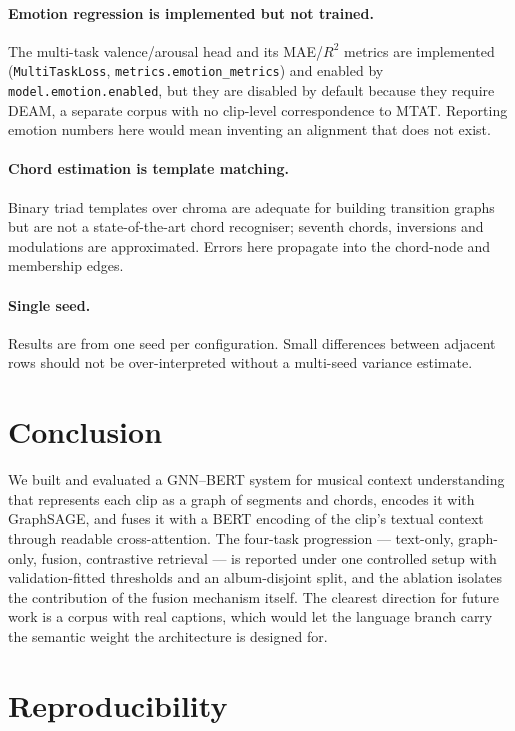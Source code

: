 \documentclass{article}
\begin{document}
\paragraph{Emotion regression is implemented but not trained.} The multi-task
valence/arousal head and its MAE/$R^2$ metrics are implemented
(\texttt{MultiTaskLoss}, \texttt{metrics.emotion\_metrics}) and enabled by
\texttt{model.emotion.enabled}, but they are disabled by default because they
require DEAM, a separate corpus with no clip-level correspondence to MTAT.
Reporting emotion numbers here would mean inventing an alignment that does not
exist.

\paragraph{Chord estimation is template matching.} Binary triad templates over
chroma are adequate for building transition graphs but are not a state-of-the-art
chord recogniser; seventh chords, inversions and modulations are approximated.
Errors here propagate into the chord-node and membership edges.

\paragraph{Single seed.} Results are from one seed per configuration. Small
differences between adjacent rows should not be over-interpreted without a
multi-seed variance estimate.

\section{Conclusion}
\label{sec:conclusion}

We built and evaluated a GNN--BERT system for musical context understanding that
represents each clip as a graph of segments and chords, encodes it with
GraphSAGE, and fuses it with a BERT encoding of the clip's textual context
through readable cross-attention. The four-task progression --- text-only,
graph-only, fusion, contrastive retrieval --- is reported under one controlled
setup with validation-fitted thresholds and an album-disjoint split, and the
ablation isolates the contribution of the fusion mechanism itself. The clearest
direction for future work is a corpus with real captions, which would let the
language branch carry the semantic weight the architecture is designed for.

\section*{Reproducibility}
\end{document}
